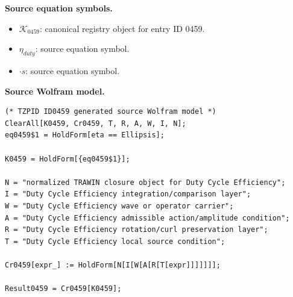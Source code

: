 \begin{minipage}[t]{0.49\linewidth}
\begingroup
\small
\raggedright
\textbf{Source equation symbols.}\par
\begin{itemize}[leftmargin=1.35em,itemsep=1pt,topsep=1pt,parsep=0pt]
    \item $\mathcal{K}_{0459}$: canonical registry object for entry ID 0459.
    \item $\eta_{duty}$: source equation symbol.
    \item $\cdot s$: source equation symbol.
\end{itemize}
\endgroup
\end{minipage}\hfill
\begin{minipage}[t]{0.47\linewidth}
\begingroup
\scriptsize
\raggedright
\textbf{Source Wolfram model.}\par
\begin{Verbatim}[fontsize=\tiny,breaklines=true,breakanywhere=true]
(* TZPID ID0459 generated source Wolfram model *)
ClearAll[K0459, Cr0459, T, R, A, W, I, N];
eq0459$1 = HoldForm[eta == Ellipsis];

K0459 = HoldForm[{eq0459$1}];

N = "normalized TRAWIN closure object for Duty Cycle Efficiency";
I = "Duty Cycle Efficiency integration/comparison layer";
W = "Duty Cycle Efficiency wave or operator carrier";
A = "Duty Cycle Efficiency admissible action/amplitude condition";
R = "Duty Cycle Efficiency rotation/curl preservation layer";
T = "Duty Cycle Efficiency local source condition";

Cr0459[expr_] := HoldForm[N[I[W[A[R[T[expr]]]]]]];

Result0459 = Cr0459[K0459];
\end{Verbatim}
\endgroup
\end{minipage}


